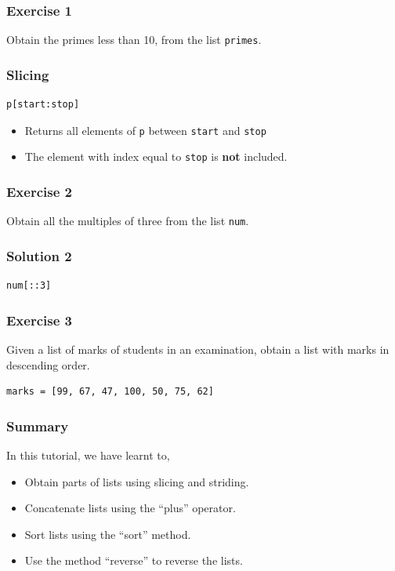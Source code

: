 \documentclass[presentation]{beamer}
\begin{document}
\begin{frame}
\frametitle{Exercise 1}
\label{sec-4}

  Obtain the primes less than 10, from the list  \verb~primes~. 
\end{frame}
\begin{frame}[fragile]
\frametitle{Slicing}
\label{sec-5}

\lstset{language=Python}
\begin{lstlisting}
p[start:stop]
\end{lstlisting}

\begin{itemize}
\item Returns all elements of \verb~p~ between \verb~start~ and \verb~stop~
\item The element with index equal to \verb~stop~ is \textbf{not} included.
\end{itemize}
\end{frame}
\begin{frame}
\frametitle{Exercise 2}
\label{sec-6}

  Obtain all the multiples of three from the list \verb~num~.
\end{frame}
\begin{frame}[fragile]
\frametitle{Solution 2}
\label{sec-7}

\lstset{language=Python}
\begin{lstlisting}
num[::3]
\end{lstlisting}
\end{frame}
\begin{frame}[fragile]
\frametitle{Exercise 3}
\label{sec-8}

  Given a list of marks of students in an examination, obtain a list
  with marks in descending order.
\lstset{language=Python}
\begin{lstlisting}
marks = [99, 67, 47, 100, 50, 75, 62]
\end{lstlisting}
\end{frame}
\begin{frame}
\frametitle{Summary}
\label{sec-9}

  In this tutorial, we have learnt to,


\begin{itemize}
\item Obtain parts of lists using slicing and striding.
\item Concatenate lists using the ``plus'' operator.
\item Sort lists using the ``sort'' method.
\item Use the method ``reverse'' to reverse the lists.
\end{itemize}
\end{frame}
\end{document}
